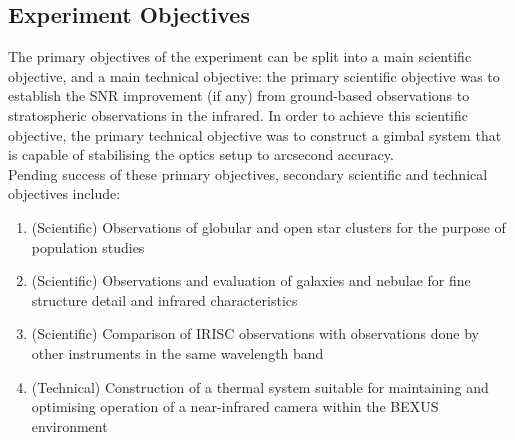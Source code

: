 \subsection{Experiment Objectives}

The primary objectives of the experiment can be split into a main scientific objective, and a main technical objective: the primary scientific objective was to establish the SNR improvement (if any) from ground-based observations to stratospheric observations in the infrared. In order to achieve this scientific objective, the primary technical objective was to construct a gimbal system that is capable of stabilising the optics setup to arcsecond accuracy.\\

Pending success of these primary objectives, secondary scientific and technical objectives include:
\renewcommand{\labelenumi}{\Roman{enumi}}
\begin{enumerate}
    \item (Scientific) Observations of globular and open star clusters for the purpose of population studies
    \item (Scientific) Observations and evaluation of galaxies and nebulae for fine structure detail and infrared characteristics
    \item (Scientific) Comparison of IRISC observations with observations done by other instruments in the same wavelength band
    \item (Technical) Construction of a thermal system suitable for maintaining and optimising operation of a near-infrared camera within the BEXUS environment
\end{enumerate}
